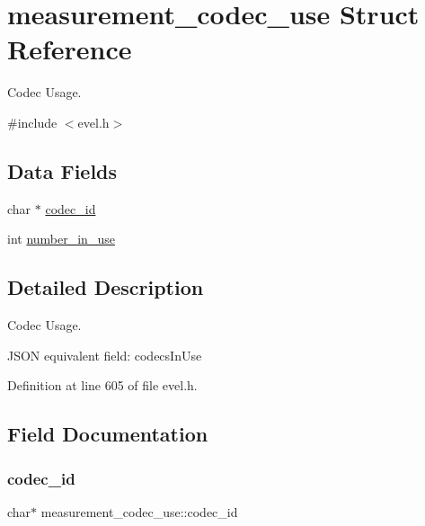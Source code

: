 \hypertarget{structmeasurement__codec__use}{}\section{measurement\+\_\+codec\+\_\+use Struct Reference}
\label{structmeasurement__codec__use}


Codec Usage.  




{\ttfamily \#include $<$evel.\+h$>$}

\subsection*{Data Fields}
\begin{DoxyCompactItemize}
\item 
char $\ast$ \hyperlink{structmeasurement__codec__use_aa84452b4ffcae1ccec4e40f8570f63a9}{codec\+\_\+id}
\item 
int \hyperlink{structmeasurement__codec__use_a3f85bcdaf82c4b32b34b4a915673e31d}{number\+\_\+in\+\_\+use}
\end{DoxyCompactItemize}


\subsection{Detailed Description}
Codec Usage. 

J\+S\+ON equivalent field\+: codecs\+In\+Use 

Definition at line 605 of file evel.\+h.



\subsection{Field Documentation}
\hypertarget{structmeasurement__codec__use_aa84452b4ffcae1ccec4e40f8570f63a9}{}\label{structmeasurement__codec__use_aa84452b4ffcae1ccec4e40f8570f63a9} 
\subsubsection{\texorpdfstring{codec\+\_\+id}{codec\_id}}
{\footnotesize\ttfamily char$\ast$ measurement\+\_\+codec\+\_\+use\+::codec\+\_\+id}



